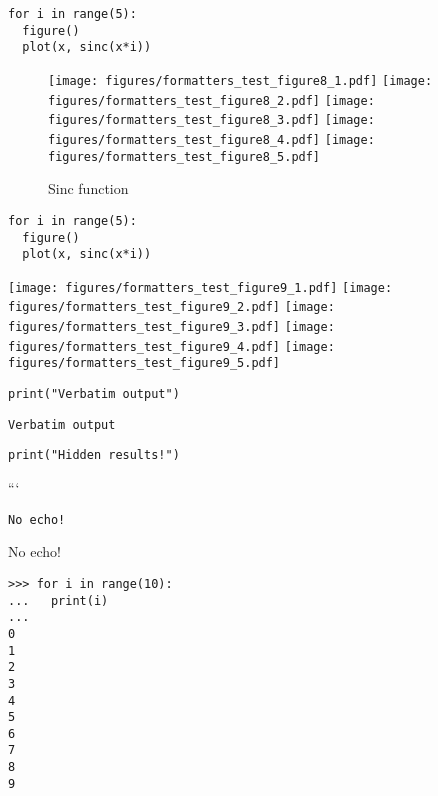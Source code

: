 \begin{verbatim}
for i in range(5):
  figure()
  plot(x, sinc(x*i))
\end{verbatim}
\begin{sidefigure}
\begin{figure}[htpb]
\center
\texttt{[image: figures/formatters\_test\_figure8\_1.pdf]}
\texttt{[image: figures/formatters\_test\_figure8\_2.pdf]}
\texttt{[image: figures/formatters\_test\_figure8\_3.pdf]}
\texttt{[image: figures/formatters\_test\_figure8\_4.pdf]}
\texttt{[image: figures/formatters\_test\_figure8\_5.pdf]}
\caption{Sinc function}
\label{fig:None}
\end{figure}
\end{sidefigure}



\begin{verbatim}
for i in range(5):
  figure()
  plot(x, sinc(x*i))
\end{verbatim}
\texttt{[image: figures/formatters\_test\_figure9\_1.pdf]}
\texttt{[image: figures/formatters\_test\_figure9\_2.pdf]}
\texttt{[image: figures/formatters\_test\_figure9\_3.pdf]}
\texttt{[image: figures/formatters\_test\_figure9\_4.pdf]}
\texttt{[image: figures/formatters\_test\_figure9\_5.pdf]}




\begin{verbatim}
print("Verbatim output")
\end{verbatim}
\begin{verbatim}
Verbatim output

\end{verbatim}



\begin{verbatim}
print("Hidden results!")
\end{verbatim}


```


\begin{verbatim}
No echo!

\end{verbatim}



No echo!




\begin{verbatim}
>>> for i in range(10):
...   print(i)
...
0
1
2
3
4
5
6
7
8
9

\end{verbatim}



